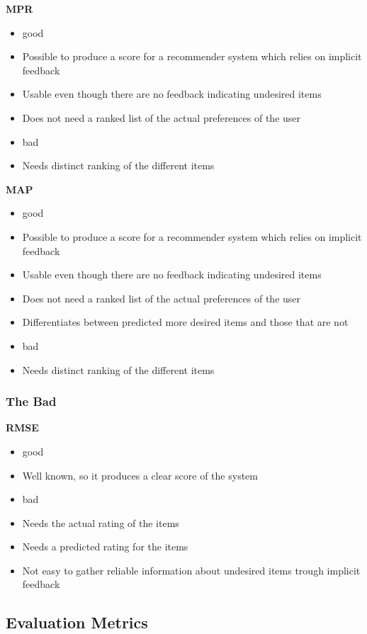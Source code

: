 \textbf{MPR}
\begin{itemize}
	\item good
	\item Possible to produce a score for a recommender system which relies on implicit feedback
	\item Usable even though there are no feedback indicating undesired items
	\item Does not need a ranked list of the actual preferences of the user
	\item bad
	\item Needs distinct ranking of the different items
\end{itemize}

\textbf{MAP}
\begin{itemize}
	\item good
	\item Possible to produce a score for a recommender system which relies on implicit feedback
	\item Usable even though there are no feedback indicating undesired items
	\item Does not need a ranked list of the actual preferences of the user
	\item Differentiates between predicted more desired items and those that are not
	\item bad
	\item Needs distinct ranking of the different items
\end{itemize}


\subsubsection{The Bad}
\textbf{RMSE}
\begin{itemize}
	\item good
	\item Well known, so it produces a clear score of the system
	\item bad
	\item Needs the actual rating of the items
	\item Needs a predicted rating for the items
	\item Not easy to gather reliable information about undesired items trough implicit feedback
\end{itemize}



\subsection{Evaluation Metrics}


